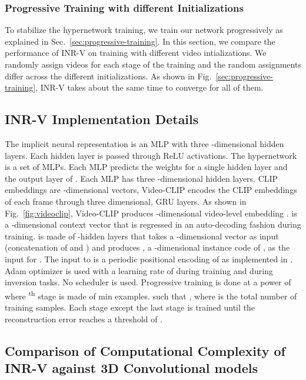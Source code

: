 \documentclass[10pt]{article} \usepackage[accepted]{tmlr}
\begin{document}
\subsubsection{Progressive Training with different Initializations}

To stabilize the hypernetwork training, we train our network progressively as explained in Sec.~\ref{sec:progressive-training}. In this section, we compare the performance of INR-V on training with different video intializations. We randomly assign videos for each stage of the training and the random assignments differ across the different initializations. As shown in Fig.~\ref{sec:progressive-training}, INR-V takes about the same time to converge for all of them.


\subsection{INR-V Implementation Details}
\label{sec:appendix-archdets}

The implicit neural representation  is an MLP with three -dimensional hidden layers. 
Each hidden layer is passed through ReLU activations. The hypernetwork  is a set of MLPs. Each MLP predicts the weights for a single hidden layer and the output layer of . Each MLP has three -dimensional hidden layers. CLIP embeddings are -dimensional vectors, Video-CLIP encodes the CLIP embeddings of each frame through three  dimensional, GRU layers. As shown in Fig.~\ref{fig:videoclip}, Video-CLIP produces -dimensional video-level embedding .  is a -dimensional context vector that is regressed in an auto-decoding fashion during training.  is made of -hidden layers that takes a -dimensional vector as input (concatenation of  and ) and produces , a -dimensional instance code of , as the input for . The input to  is a periodic positional encoding of  
as implemented in \cite{lfns}. Adam optimizer is used with a learning rate of  during training and  during inversion tasks. No scheduler is used. Progressive training is done at a power of  where \textsuperscript{th} stage is made of min examples.  such that , where  is the total number of training samples. Each stage except the last stage is trained until the reconstruction error reaches a threshold of .

\subsection{Comparison of Computational Complexity of INR-V against 3D Convolutional models}
\end{document}
